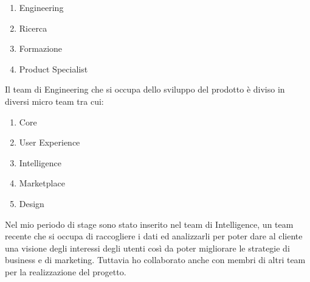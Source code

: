 \documentclass[a4paper, 12pt, twoside, openright]{book}
\begin{document}
\begin{enumerate}
\item Engineering
\item Ricerca
\item Formazione
\item Product Specialist
\end{enumerate}
Il team di Engineering che si occupa dello sviluppo del prodotto è diviso in diversi micro team tra cui:
\begin{enumerate}
\item Core
\item User Experience
\item Intelligence
\item Marketplace
\item Design
\end{enumerate}
Nel mio periodo di stage sono stato inserito nel team di Intelligence, un team recente che si occupa di raccogliere i dati ed analizzarli per poter dare al cliente una visione degli interessi degli utenti così da poter migliorare le strategie di business e di marketing. Tuttavia ho collaborato anche con membri di altri team per la realizzazione del progetto.

\newpage{}
\end{document}
